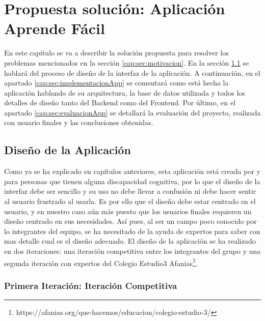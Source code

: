 \chapter{Propuesta solución: Aplicación Aprende Fácil}
\label{cap:aprendeFacil}

En este capítulo se va a describir la solución propuesta para resolver los problemas mencionados en la sección \ref{cap:sec:motivacion}. En la sección \ref{cap:sec:disenioInterfaz} se hablará del proceso de diseño de la interfaz de la aplicación. A continuación, en el apartado \ref{cap:sec:implementacionApp} se comentará como está hecha la aplicación hablando de su arquitectura, la base de datos utilizada y todos los detalles de diseño tanto del Backend como del Frontend. Por último, en el apartado \ref{cap:sec:evaluacionApp} se detallará la evaluación del proyecto, realizada con usuario finales y las conclusiones obtenidas.

\section{Diseño de la Aplicación}
\label{cap:sec:disenioInterfaz}
Como ya se ha explicado en capítulos anteriores, esta aplicación está creada por y para personas que tienen alguna discapacidad cognitiva, por lo que el diseño de la interfaz debe ser sencillo y su uso no debe llevar a confusión ni debe hacer sentir al usuario frustrado al usarla. 
Es por ello que el diseño debe estar centrado en el usuario, y en nuestro caso aún más puesto que los usuarios finales requieren un diseño centrado en sus necesidades. Así pues, al ser un campo poco conocido por lo integrantes del equipo, se ha necesitado de la ayuda de expertos para saber con mas detalle cual es el diseño adecuado. 
El diseño de la aplicación se ha realizado en dos iteraciones: una iteración competitiva entre los integrantes del grupo y una segunda iteración con expertos del Colegio Estudio3 Afanias\footnote{https://afanias.org/que-hacemos/educacion/colegio-estudio-3/}. 


\subsection{Primera Iteración: Iteración Competitiva}
\label{cap:subsec:iteracionCompetitiva}

